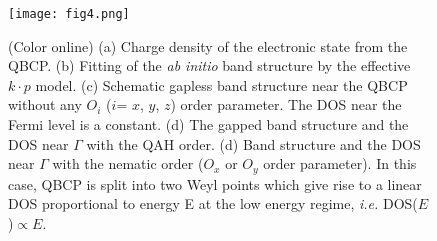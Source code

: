 \documentclass[twocolumn,english,prb,showpacs]{revtex4-1}
\begin{document}
\begin{figure}[t]
\centering{}
\texttt{[image: fig4.png]}
\caption{(Color online)
(a) Charge density of the electronic state from the QBCP. (b) Fitting of the \textit{ab initio} band structure by the effective $k\cdot p$ model.
(c) Schematic gapless band structure near the QBCP without any $O_i$ ($i$= $x$, $y$, $z$) order parameter. The DOS near the Fermi level is a constant. (d) The gapped band structure and the DOS near $\Gamma$ with the QAH order.  (d) Band structure and the DOS near $\Gamma$ with the nematic order ($O_x$ or $O_y$ order parameter). In this case, QBCP is split into two Weyl points which give rise to a linear DOS proportional to energy E at the low energy regime,
\textit{i.e.} DOS($E$)$\propto E$.
\label{fig:order2}}
\end{figure}
\end{document}
